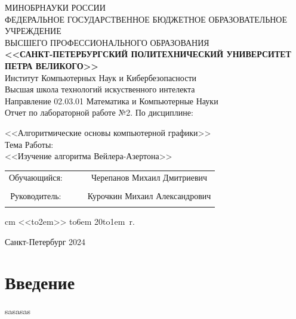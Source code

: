 \documentclass[12pt]{article}
\begin{document}
\begin{center}
\hfill \break
\large{МИНОБРНАУКИ РОССИИ} \\
\hfill \break
\small {ФЕДЕРАЛЬНОЕ ГОСУДАРСТВЕННОЕ БЮДЖЕТНОЕ ОБРАЗОВАТЕЛЬНОЕ УЧРЕЖДЕНИЕ }\\
\small { ВЫСШЕГО ПРОФЕССИОНАЛЬНОГО ОБРАЗОВАНИЯ  } \\
\hfill \break
\normalsize {\textbf{ <<САНКТ-ПЕТЕРБУРГСКИЙ ПОЛИТЕХНИЧЕСКИЙ УНИВЕРСИТЕТ } }\\
{\normalsize {\textbf { ПЕТРА ВЕЛИКОГО>>}}} \\
\hfill \break
\large{Институт Компьютерных Наук и Кибербезопасности }\\
\hfill \break
\large{ Высшая школа технологий искуственного интелекта }\\
\hfill \break
Направление 02.03.01 Математика и Компьютерные Науки\\
\vskip 1cm
\large {Отчет по лабораторной работе №2.}
\vskip 0.2cm
\large {По дисциплине:}

\large{<<Алгоритмические основы компьютерной графики>>} \\
\hfill \break
\normalsize{Тема Работы:} \\
\hfill \break
\normalsize{<<Изучение алгоритма Вейлера-Азертона>>} \\
\thispagestyle {empty}

\hfill \break
\vskip 0.3cm
\vskip 1cm
\end{center}
\begin {tabular}{cccc}
\hspace{0.5cm}Обучающийся: &\underline {\hspace{3cm}} &  &Черепанов Михаил Дмитриевич\\\\
\hspace{0.5cm}Руководитель: &\underline {\hspace{3cm}} & &Курочкин Михаил Александрович\\\\
\end{tabular}
 cm
\hspace{9cm}\def \hrf#1{\hbox to#1{\hrulefill}}<<\hrf{2em}>>  \hrf{6em}  20\hrf{1em}~r.
\vskip 2cm
\begin {center} Санкт-Петербург 2024 \end{center}
\newpage
\tableofcontents
\newpage




\section*{Введение}
 sasasas
 
\end{document}

